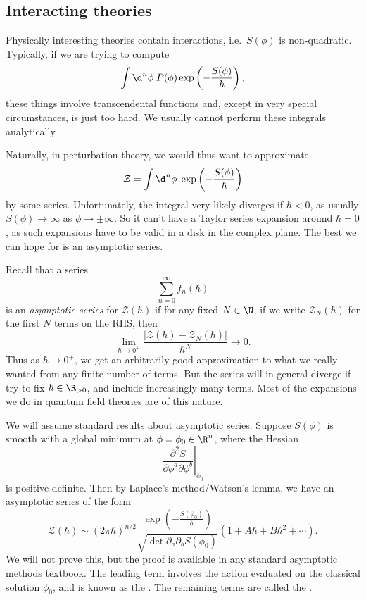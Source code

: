 \documentclass[a4paper]{article}
\begin{document}
\subsection{Interacting theories}
Physically interesting theories contain interactions, i.e.\ $S(\phi)$ is non-quadratic. Typically, if we are trying to compute
\[
  \int \d^n \phi\; P(\phi) \exp\left(-\frac{S(\phi)}{\hbar}\right),
\]
these things involve transcendental functions and, except in very special circumstances, is just too hard. We usually cannot perform these integrals analytically.

Naturally, in perturbation theory, we would thus want to approximate
\[
  \mathcal{Z} = \int \d^n \phi\; \exp\left(-\frac{S(\phi)}{\hbar}\right)
\]
by some series. Unfortunately, the integral very likely diverges if $\hbar < 0$, as usually $S(\phi) \to \infty$ as $\phi \to \pm\infty$. So it can't have a Taylor series expansion around $\hbar = 0$, as such expansions have to be valid in a disk in the complex plane. The best we can hope for is an asymptotic series.

Recall that a series
\[
  \sum_{n = 0}^\infty f_n(\hbar)
\]
is an \emph{asymptotic series} for $\mathcal{Z}(\hbar)$ if for any fixed $N \in \N$, if we write $\mathcal{Z}_N(\hbar)$ for the first $N$ terms on the RHS, then
\[
  \lim_{\hbar \to 0^+} \frac{|\mathcal{Z}(\hbar) - \mathcal{Z}_N(\hbar)|}{\hbar^N} \to 0.
\]
Thus as $\hbar \to 0^+$, we get an arbitrarily good approximation to what we really wanted from any finite number of terms. But the series will in general diverge if try to fix $\hbar \in \R_{> 0}$, and include increasingly many terms. Most of the expansions we do in quantum field theories are of this nature.

We will assume standard results about asymptotic series. Suppose $S(\phi)$ is smooth with a global minimum at $\phi = \phi_0 \in \R^n$, where the Hessian
\[
  \left.\frac{\partial^2 S}{\partial \phi^a \partial \phi^b}\right|_{\phi_0}
\]
is positive definite. Then by Laplace's method/Watson's lemma, we have an asymptotic series of the form
\[
  \mathcal{Z}(\hbar) \sim (2\pi \hbar)^{n/2} \frac{\exp\left(-\frac{S(\phi_0)}{\hbar}\right)}{\sqrt{\det \partial_a \partial_b S(\phi_0)}} \left(1 + A \hbar + B \hbar^2 + \cdots\right).
\]
We will not prove this, but the proof is available in any standard asymptotic methods textbook. The leading term involves the action evaluated on the classical solution $\phi_0$, and is known as the . The remaining terms are called the .
\end{document}
